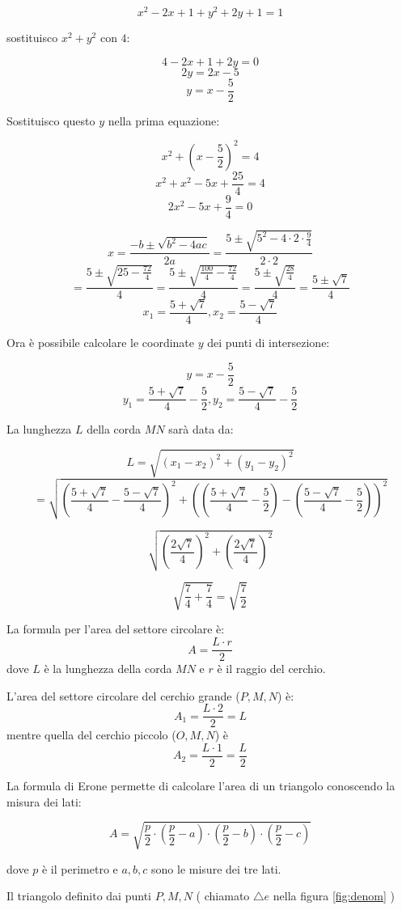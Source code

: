 \[ x^2 -2x +1 +y^2 +2y+1=1 \]

sostituisco $x^2+y^2$ con $4$:

\[ 4-2x+1+2y=0 \]
\[ 2y=2x-5  \]
\[ y=x-\frac{5}{2} \]

Sostituisco questo $y$ nella prima equazione:

\[ x^2+\left( x-\frac{5}{2} \right)^2=4 \]
\[ x^2+x^2-5x+\frac{25}{4} =4 \]
\[ 2x^2-5x+\frac{9}{4}=0 \]

\[ x=\frac{-b\pm \sqrt{b^2-4ac}}{2a} =
\frac{5\pm \sqrt{5^2-4\cdot 2 \cdot \frac{9}{4}}}{2\cdot 2}\]
\[=\frac{5\pm\sqrt{25-\frac{72}{4}}}{4}
=\frac{5\pm\sqrt{\frac{100}{4}-\frac{72}{4}}}{4}
=\frac{5\pm\sqrt{\frac{28}{4}}}{4}
=\frac{5\pm\sqrt{7}}{4}
\]
\[x_1=\frac{5+\sqrt{7}}{4}
,
x_2=\frac{5-\sqrt{7}}{4}
\]

Ora è possibile calcolare le coordinate $y$ dei punti 
di intersezione:

\[ y=x-\frac{5}{2} \]
\[ y_1=\frac{5+\sqrt{7}}{4}-\frac{5}{2}
, 
y_2=\frac{5-\sqrt{7}}{4}-\frac{5}{2}\]

La lunghezza $L$ della corda $MN$ sarà data da:

\[ L= \sqrt{(x_1-x_2)^2+(y_1-y_2)^2} \]
\[ =\sqrt
{
\left(\frac{5+\sqrt{7}}{4}-\frac{5-\sqrt{7}}{4}\right)^2 +
\left(
	\left( \frac{5+\sqrt{7}}{4}-\frac{5}{2} \right)
	-
	\left( \frac{5-\sqrt{7}}{4}-\frac{5}{2} \right)
\right)^2
} \]

\[ \sqrt{ \left( \frac{2\sqrt{7}}{4} \right)^2 + \left( \frac{2\sqrt{7}}{4} \right)^2} \]

\[ \sqrt { \frac{7}{4} + \frac{7}{4} } = \sqrt{\frac{7}{2}}\]

La formula per l'area del settore circolare è:
\[A=\frac{L\cdot r}{2}\]
dove $L$ è la lunghezza della corda $MN$ e $r$ è il raggio
del cerchio.

L'area del settore circolare del cerchio grande ($P, M, N$) è:
\[A_1=\frac{L\cdot 2}{2}=L\]
mentre quella del cerchio piccolo ($O, M, N$) è
\[A_2=\frac{L\cdot 1}{2}=\frac{L}{2}\]

La formula di Erone permette di calcolare l'area di un triangolo conoscendo
la misura dei lati:

\[A=\sqrt{
\frac{p}{2}
\cdot\left(\frac{p}{2}-a\right)
\cdot\left(\frac{p}{2}-b\right)
\cdot\left(\frac{p}{2}-c\right)
}\]

dove $p$ è il perimetro e $a, b, c$ sono le misure dei tre lati.

Il triangolo 
definito dai punti $P, M, N$
( chiamato $\triangle e$ nella figura \ref{fig:denom} )

